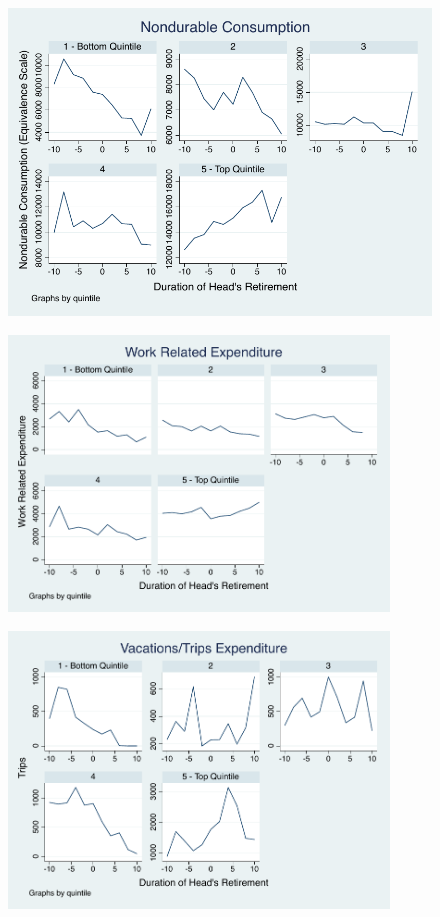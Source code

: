 \documentclass[11pt]{article}
\begin{document}
\begin{figure}[h]
	\centering
	\includegraphics[width=1\textwidth]{../ConsumptionPostRetirement/expenditure_blundell_eq.pdf}
\end{figure}

\begin{figure}[h]
	\centering
	\includegraphics[width=0.9\textwidth]{../ConsumptionPostRetirement/work.pdf}
\end{figure}


\begin{figure}[h]
	\centering
	\includegraphics[width=0.9\textwidth]{../ConsumptionPostRetirement/trips.pdf}
\end{figure}
\end{document}
